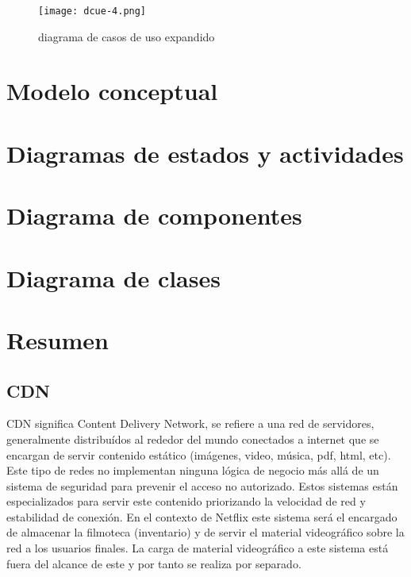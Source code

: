 \documentclass{article}
\begin{document}
\begin{figure}[h]
	\centering
        \texttt{[image: dcue-4.png]}
                 \caption{diagrama de casos de uso expandido}
\end{figure}	
\section{Modelo conceptual}
\section{Diagramas de estados y actividades}
\section{Diagrama de componentes}
\section{Diagrama de clases}
\section{Resumen}
\subsection{CDN}
CDN significa Content Delivery Network, se refiere a una red 
de servidores, generalmente distribuídos al rededor del mundo
conectados  a internet que se encargan de servir contenido
estático (imágenes, video, música, pdf, html, etc). Este tipo
de redes no implementan ninguna lógica de negocio más allá de un
sistema de seguridad para prevenir el acceso no autorizado.
Estos sistemas están especializados para servir este 
contenido priorizando la velocidad de red y estabilidad de conexión.
En el contexto de Netflix este sistema será el encargado de almacenar
la filmoteca (inventario) y de servir el material videográfico 
sobre la red a los usuarios finales. 
La carga de material videográfico a este sistema está 
fuera del alcance de este y por tanto se realiza por separado.
\end{document}
